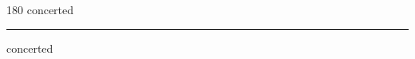 
\begin{frame}
\begin{center}
\begin{turn}{180}
{\fontsize{2.5cm}{1em}\selectfont concerted}
\end{turn}
\vspace{1em}\par  
\hrule
\vspace{1em}\par  
{\fontsize{2.5cm}{1em}\selectfont concerted}
\end{center}
\end{frame}
